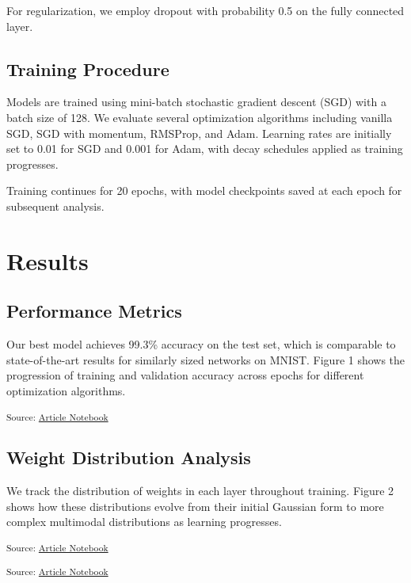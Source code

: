 \documentclass[
  11pt,
  twocolumn,
  a4paper]{article}
\begin{document}
For regularization, we employ dropout with probability 0.5 on the fully
connected layer.

\subsection{Training Procedure}\label{training-procedure}

Models are trained using mini-batch stochastic gradient descent (SGD)
with a batch size of 128. We evaluate several optimization algorithms
including vanilla SGD, SGD with momentum, RMSProp, and Adam. Learning
rates are initially set to 0.01 for SGD and 0.001 for Adam, with decay
schedules applied as training progresses.

Training continues for 20 epochs, with model checkpoints saved at each
epoch for subsequent analysis.

\section{Results}\label{results}

\subsection{Performance Metrics}\label{performance-metrics}

Our best model achieves 99.3\% accuracy on the test set, which is
comparable to state-of-the-art results for similarly sized networks on
MNIST. Figure 1 shows the progression of training and validation
accuracy across epochs for different optimization algorithms.

\textsubscript{Source:
\href{https://Jing-yilin.github.io/mnist/index.qmd.html}{Article
Notebook}}

\subsection{Weight Distribution
Analysis}\label{weight-distribution-analysis}

We track the distribution of weights in each layer throughout training.
Figure 2 shows how these distributions evolve from their initial
Gaussian form to more complex multimodal distributions as learning
progresses.

\textsubscript{Source:
\href{https://Jing-yilin.github.io/mnist/index.qmd.html}{Article
Notebook}}

\textsubscript{Source:
\href{https://Jing-yilin.github.io/mnist/index.qmd.html}{Article
Notebook}}
\end{document}
